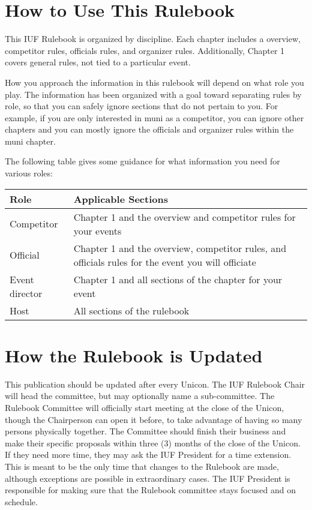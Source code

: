 \section{How to Use This Rulebook}

This IUF Rulebook is organized by discipline.
Each chapter includes a overview, competitor rules, officials rules, and organizer rules.
Additionally, Chapter 1 covers general rules, not tied to a particular event.

How you approach the information in this rulebook will depend on what role you play.
The information has been organized with a goal toward separating rules by role, so that you can safely ignore sections that do not pertain to you.
For example, if you are only interested in muni as a competitor, you can ignore other chapters and you can mostly ignore the officials and organizer rules within the muni chapter.

The following table gives some guidance for what information you need for various roles:

\begin{longtable}{|l|p{8cm}|}
\hline
\textbf{Role} & \textbf{Applicable Sections} \\
\hline
Competitor & Chapter 1 and the overview and competitor rules for your events\\
\hline
Official & Chapter 1 and the overview, competitor rules, and officials rules for the event you will officiate\\
\hline
Event director & Chapter 1 and all sections of the chapter for your event \\
\hline
Host & All sections of the rulebook\\
\hline
\end{longtable}

\section{How the Rulebook is Updated}

This publication should be updated after every Unicon.
The IUF Rulebook Chair will head the committee, but may optionally name a sub-committee.
The Rulebook Committee will officially start meeting at the close of the Unicon, though the Chairperson can open it before, to take advantage of having so many persons physically together.
The Committee should finish their business and make their specific proposals within three (3) months of the close of the Unicon.
If they need more time, they may ask the IUF President for a time extension.
This is meant to be the only time that changes to the Rulebook are made, although exceptions are possible in extraordinary cases.
The IUF President is responsible for making sure that the Rulebook committee stays focused and on schedule.

